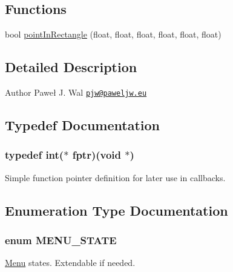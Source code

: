 \subsection*{Functions}
\begin{DoxyCompactItemize}
\item 
bool \hyperlink{molto-allegro_8h_a5055d55f6c5a33bd390799e086a69d0d}{point\-In\-Rectangle} (float, float, float, float, float, float)
\end{DoxyCompactItemize}


\subsection{Detailed Description}
\begin{DoxyAuthor}{Author}
Paweł J. Wal \href{mailto:pjw@paweljw.eu}{\tt pjw@paweljw.\-eu} 
\end{DoxyAuthor}


\subsection{Typedef Documentation}
\hypertarget{molto-allegro_8h_ab4d4c3a68df99ae93deb075950a7e396}{
\subsubsection[{fptr}]{\setlength{\rightskip}{0pt plus 5cm}typedef int($\ast$ fptr)(void $\ast$)}}\label{molto-allegro_8h_ab4d4c3a68df99ae93deb075950a7e396}
Simple function pointer definition for later use in callbacks. 

\subsection{Enumeration Type Documentation}
\hypertarget{molto-allegro_8h_a8b022cbaf1689aca386d8e721bfd9f25}{
\subsubsection[{M\-E\-N\-U\-\_\-\-S\-T\-A\-T\-E}]{\setlength{\rightskip}{0pt plus 5cm}enum {\bf M\-E\-N\-U\-\_\-\-S\-T\-A\-T\-E}}}\label{molto-allegro_8h_a8b022cbaf1689aca386d8e721bfd9f25}
\hyperlink{classMenu}{Menu} states. Extendable if needed. 

